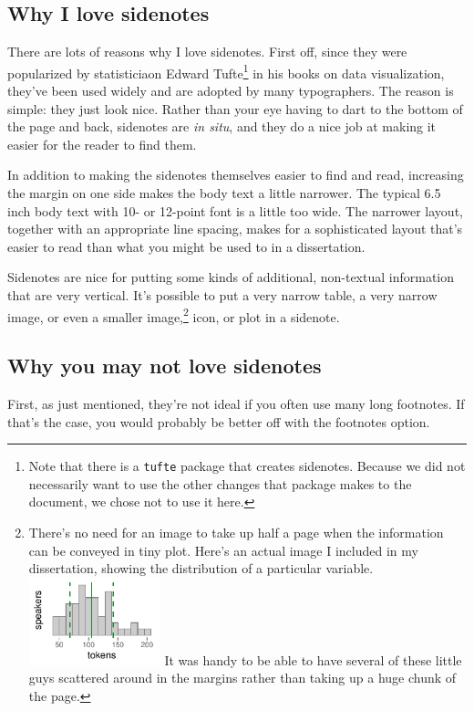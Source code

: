 \documentclass[./dissertation.tex]{subfiles}
\begin{document}
    \subsection{Why I love sidenotes}

    There are lots of reasons why I love sidenotes. First off, since they were popularized by statisticiaon Edward Tufte\footnote{Note that there is a \texttt{tufte} package that creates sidenotes. Because we did not necessarily want to use the other changes that package makes to the document, we chose not to use it here.} in his books on data visualization, they've been used widely and are adopted by many typographers. The reason is simple: they just look nice. Rather than your eye having to dart to the bottom of the page and back, sidenotes are \textit{in situ}, and they do a nice job at making it easier for the reader to find them.

    In addition to making the sidenotes themselves easier to find and read, increasing the margin on one side makes the body text a little narrower. The typical 6.5 inch body text with 10- or 12-point font is a little too wide. The narrower layout, together with an appropriate line spacing, makes for a sophisticated layout that's easier to read than what you might be used to in a dissertation.

    Sidenotes are nice for putting some kinds of additional, non-textual information that are very vertical. It's possible to put a very narrow table, a very narrow image, or even a smaller image,\footnote{There's no need for an image to take up half a page when the information can be conveyed in tiny plot. Here's an actual image I included in my dissertation, showing the distribution of a particular variable. \includegraphics[width = 1.5in]{figures/tiny.pdf} It was handy to be able to have several of these little guys scattered around in the margins rather than taking up a huge chunk of the page.} icon, or plot in a sidenote.


    \subsection{Why you may not love sidenotes}

    First, as just mentioned, they're not ideal if you often use many long footnotes. If that's the case, you would probably be better off with the footnotes option.
\end{document}
